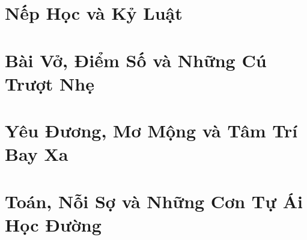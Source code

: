 \documentclass[12pt,a4paper,oneside,openany]{book}
\begin{document}
\pagecolor{pearlbg}
\color{noteink}

\frontmatter
\hypersetup{pageanchor=false}

\clearpage
\hypersetup{pageanchor=true}

\tableofcontents
\clearpage

\mainmatter
\part{Nếp Học và Kỷ Luật}










\part{Bài Vở, Điểm Số và Những Cú Trượt Nhẹ}










\part{Yêu Đương, Mơ Mộng và Tâm Trí Bay Xa}










\part{Toán, Nỗi Sợ và Những Cơn Tự Ái Học Đường}










\end{document}

